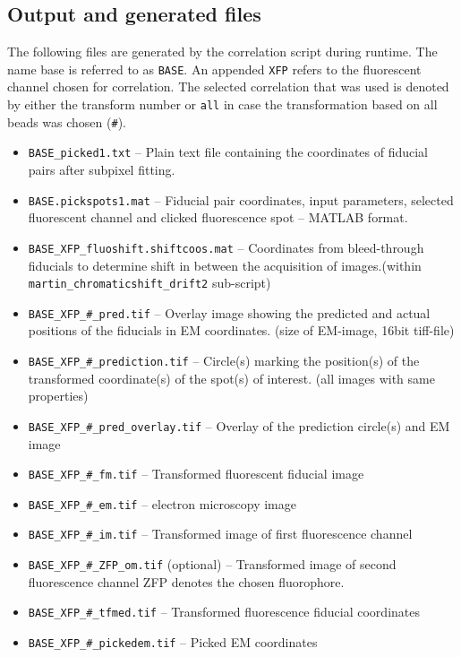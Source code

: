 \documentclass[10pt,a4paper,onepage,DIV12]{scrartcl}
\begin{document}
\subsection{Output and generated files}
\label{sec:lm_output}
The following files are generated by the correlation script during runtime. The name base is referred to as \texttt{BASE}. An appended \texttt{XFP} refers to the fluorescent channel chosen for correlation. The selected correlation that was used is denoted by either the transform number or \texttt{all} in case the transformation based on all beads was chosen (\texttt{\#}). 
\begin{itemize}
 \item \texttt{BASE\_picked1.txt} -- Plain text file containing the coordinates of fiducial pairs after subpixel fitting. 

\item \texttt{BASE.pickspots1.mat} -- Fiducial pair coordinates, input parameters, selected fluorescent channel and clicked fluorescence spot -- MATLAB format.

 \item \texttt{BASE\_XFP\_fluoshift.shiftcoos.mat} -- Coordinates from bleed-through fiducials to determine shift in between the acquisition of images.(within \texttt{martin\_chromaticshift\_drift2} sub-script)



\item \texttt{BASE\_XFP\_\#\_pred.tif} -- Overlay image showing the predicted and actual positions of the fiducials in EM coordinates. (size of EM-image, 16bit tiff-file)
\item \texttt{BASE\_XFP\_\#\_prediction.tif} -- Circle(s) marking the position(s) of the transformed coordinate(s) of the spot(s) of interest. (all images with same properties)
\item \texttt{BASE\_XFP\_\#\_pred\_overlay.tif} -- Overlay of the prediction circle(s) and EM image
\item \texttt{BASE\_XFP\_\#\_fm.tif} -- Transformed fluorescent fiducial image 
\item \texttt{BASE\_XFP\_\#\_em.tif} -- electron microscopy image 
\item \texttt{BASE\_XFP\_\#\_im.tif} -- Transformed image of first fluorescence channel
\item \texttt{BASE\_XFP\_\#\_ZFP\_om.tif} (optional) -- Transformed image of second fluorescence channel ZFP denotes the chosen fluorophore.
\item \texttt{BASE\_XFP\_\#\_tfmed.tif} -- Transformed fluorescence fiducial coordinates
\item \texttt{BASE\_XFP\_\#\_pickedem.tif} -- Picked EM coordinates


\end{itemize}
\end{document}

